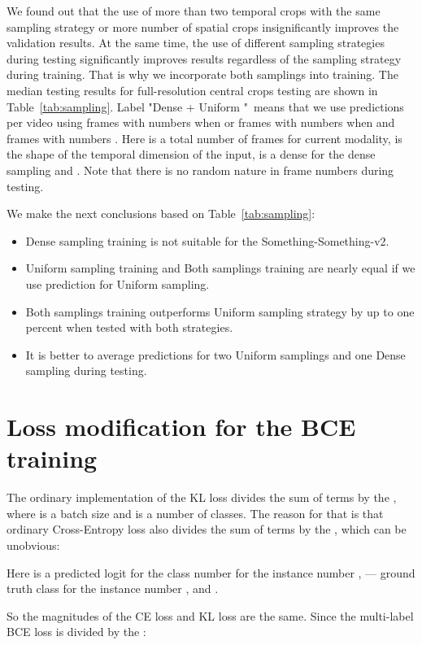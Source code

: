 \documentclass[conference]{IEEEtran}
\begin{document}
We found out that the use of more than two temporal crops with the same sampling strategy or more number of spatial crops insignificantly improves the validation results. At the same time, the use of different sampling strategies during testing significantly improves results regardless of the sampling strategy during training. That is why we incorporate both samplings into training. The median testing results for full-resolution central crops testing are shown in Table~\ref{tab:sampling}.
Label "Dense  + Uniform "\ means that we use  predictions per video using frames with numbers  when  or frames with numbers  when  and frames with numbers . Here  is a total number of frames for current modality,  is the shape of the temporal dimension of the input,  is a dense for the dense sampling and . Note that there is no random nature in frame numbers during testing.

We make the next conclusions based on Table~\ref{tab:sampling}:
\begin{itemize}
	\item Dense sampling training is not suitable for the Something-Something-v2.
	\item Uniform sampling training and Both samplings training are nearly equal if we use prediction for Uniform sampling.
	\item Both samplings training outperforms Uniform sampling strategy by up to one percent when tested with both strategies.
	\item It is better to average predictions for two Uniform samplings and one Dense sampling during testing.
\end{itemize}

\section{Loss modification for the BCE training} \label{app:c}

The ordinary implementation of the KL loss divides the sum of  terms by the , where  is a batch size and  is a number of classes. The reason for that is that ordinary Cross-Entropy loss also divides the sum of  terms by the , which can be unobvious:





Here  is a predicted logit for the class number  for the instance number ,  --- ground truth class for the instance number ,  and .

So the magnitudes of the CE loss and KL loss are the same. Since the multi-label BCE loss is divided by the :
\end{document}
